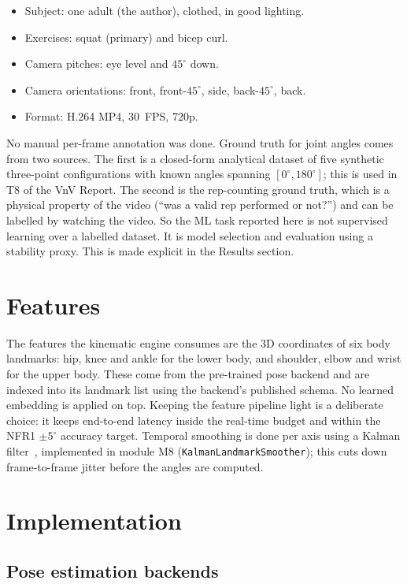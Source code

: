 \documentclass[11pt]{article}
\begin{document}
\begin{itemize}
  \item Subject: one adult (the author), clothed, in good lighting.
  \item Exercises: squat (primary) and bicep curl.
  \item Camera pitches: eye level and $45^{\circ}$ down.
  \item Camera orientations: front, front-$45^{\circ}$, side,
    back-$45^{\circ}$, back.
  \item Format: H.264 MP4, 30~FPS, 720p.
\end{itemize}

No manual per-frame annotation was done. Ground truth for joint angles
comes from two sources. The first is a closed-form analytical dataset
of five synthetic three-point configurations with known angles
spanning $[0^\circ, 180^\circ]$; this is used in T8 of the VnV Report.
The second is the rep-counting ground truth, which is a physical
property of the video (``was a valid rep performed or not?'') and can
be labelled by watching the video. So the ML task reported here is
not supervised learning over a labelled dataset. It is model selection
and evaluation using a stability proxy. This is made explicit in the
Results section.

\section{Features}

The features the kinematic engine consumes are the 3D coordinates of
six body landmarks: hip, knee and ankle for the lower body, and
shoulder, elbow and wrist for the upper body. These come from the
pre-trained pose backend and are indexed into its landmark list using
the backend's published schema. No learned embedding is applied on
top. Keeping the feature pipeline light is a deliberate choice: it
keeps end-to-end latency inside the real-time budget and within the
NFR1 $\pm 5^\circ$ accuracy target. Temporal smoothing is done per
axis using a Kalman filter~\citep{Kalman1960}, implemented in module
M8 (\texttt{KalmanLandmarkSmoother}); this cuts down frame-to-frame
jitter before the angles are computed.

\section{Implementation}

\subsection{Pose estimation backends}
\end{document}
